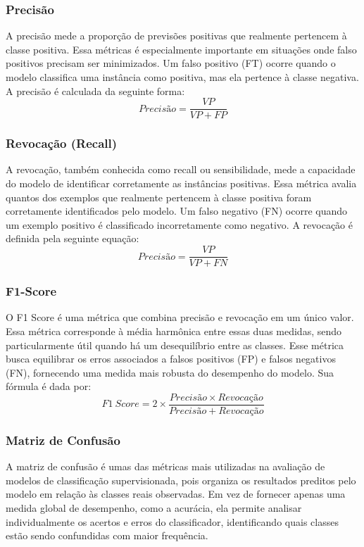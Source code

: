 \subsubsection{Precisão}
A precisão mede a proporção de previsões positivas que realmente pertencem à classe positiva.
Essa métricas é especialmente importante em situações onde falso positivos precisam ser
minimizados. Um falso positivo (FT) ocorre quando o modelo classifica uma instância como
positiva, mas ela pertence à classe negativa. A precisão é calculada da seguinte forma:
\begin{equation}
    Precisão = \frac{VP}{VP + FP}
    \label{eq:41}
\end{equation}
\subsubsection{Revocação (Recall)}
 A revocação, também conhecida como recall ou sensibilidade, mede a capacidade do modelo
de identificar corretamente as instâncias positivas. Essa métrica avalia quantos dos exemplos
que realmente pertencem à classe positiva foram corretamente identificados pelo modelo. Um
falso negativo (FN) ocorre quando um exemplo positivo é classificado incorretamente como
negativo. A revocação é definida pela seguinte equação:
\begin{equation}
    Precisão = \frac{VP}{VP + FN}
    \label{eq:42}
\end{equation}
\subsubsection{F1-Score}
O F1 Score é uma métrica que combina precisão e revocação em um único valor. Essa métrica
corresponde à média harmônica entre essas duas medidas, sendo particularmente útil quando
há um desequilíbrio entre as classes. Esse métrica busca equilibrar os erros associados a falsos
positivos (FP) e falsos negativos (FN), fornecendo uma medida mais robusta do desempenho
do modelo. Sua fórmula é dada por:
\begin{equation}
    F1\ Score = 2 \times \frac{Precisão \times Revocação}{Precisão + Revocação}
    \label{eq:43}
\end{equation}
\subsubsection{Matriz de Confusão}
A matriz de confusão é umas das métricas mais utilizadas na avaliação de modelos de
classificação supervisionada, pois organiza os resultados preditos pelo modelo em relação às
classes reais observadas. Em vez de fornecer apenas uma medida global de desempenho, como
a acurácia, ela permite analisar individualmente os acertos e erros do classificador,
identificando quais classes estão sendo confundidas com maior frequência. 

